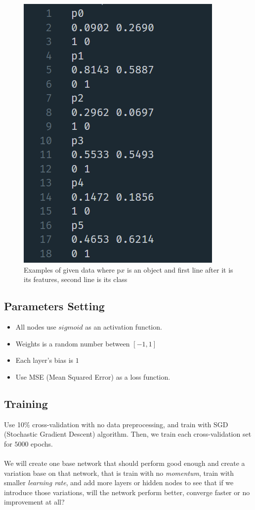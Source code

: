 \documentclass{article}
\begin{document}
\begin{figure}[ht]
	\centering
	\includegraphics[scale=0.5]{cross_data}
	\caption{Examples of given data where p$x$ is an object and first line after it is its features, second line is its class}
\end{figure}
\FloatBarrier

\subsection*{Parameters Setting}
\begin{itemize}
	\item All nodes use $sigmoid$ as an activation function.
	\item Weights is a random number between $[-1, 1]$
	\item Each layer's bias is $1$
	\item Use MSE (Mean Squared Error) as a loss function.
\end{itemize}

\subsection*{Training}
Use 10\% cross-validation with no data preprocessing, and train with SGD (Stochastic Gradient Descent) algorithm. Then, we train each cross-validation set for $5000$ epochs.
\\ \\
We will create one base network that should perform good enough and create a variation base on that network, that is train with no \emph{momentum}, train with smaller \emph{learning rate}, and add more layers or hidden nodes to see that if we introduce those variations, will the network perform better, converge faster or no improvement at all?
\end{document}

